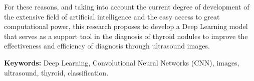For these reasons, and taking into account the current degree of development of the extensive field of artificial intelligence and the easy access to great computational power, this research proposes to develop a Deep Learning model that serves as a support tool in the diagnosis of thyroid nodules to improve the effectiveness and efficiency of diagnosis through ultrasound images.
\newline

\textbf{Keywords: } Deep Learning, Convolutional Neural Networks (CNN), images, ultrasound, thyroid, classification.